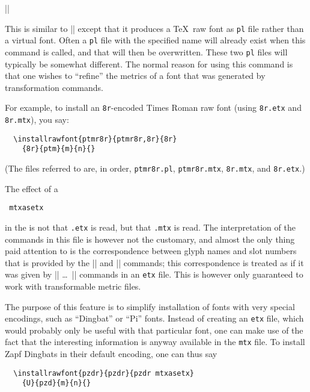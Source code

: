 \documentclass[a4paper]{ltxguide}
\makeatletter
\newenvironment{decl*}[1][]{%
   \par
   \small
   \addvspace{2.3ex}%
   \vskip -\parskip
   \ifx\relax#1\relax
      \def\@decl@date{}%
   \else
      \def\@decl@date{\NEWfeature{#1}}%
   \fi
   \noindent\hspace{-\leftmargini}%
   \begin{tabular}{|l|}%
      \hline\ignorespaces
}{%
      \\\hline
   \end{tabular}%
   \nobreak\@decl@date\par\nobreak
   \vspace{2.3ex}\vskip -\parskip
}
\newcommand*{\meta}{\m}
\newcommand*{\setfilename}[1]{\texttt{#1}}
\newcommand{\pl} {\setfilename{pl}\xspace}
\newcommand{\mtx}{\setfilename{mtx}\xspace}
\newcommand{\etx}{\setfilename{etx}\xspace}
\makeatother
\begin{document}
\begin{decl}
  |\installrawfont|\\
  \hspace*{1.5em}%
\end{decl}
This is similar to |\installfont| except that it produces
a \TeX\ raw font as \pl file rather than a virtual font. Often a \pl 
file with the specified name will already exist when this command is 
called, and that will then be overwritten. These two \pl files will 
typically be somewhat different.
The normal reason for using this command is that one wishes to 
``refine'' the metrics of a font that was generated by transformation 
commands.

For example, to install an \texttt{8r}-encoded Times Roman raw font
(using \texttt{8r.etx} and \texttt{8r.mtx}), you say:
\begin{verbatim}
  \installrawfont{ptmr8r}{ptmr8r,8r}{8r}
    {8r}{ptm}{m}{n}{}
\end{verbatim}
(The files referred to are, in order, \texttt{ptmr8r.pl}, 
\texttt{ptmr8r.mtx}, \texttt{8r.mtx}, and \texttt{8r.etx}.)

The effect of a
\begin{decl*}[v1.923]
  \meta{filename}\verb*| mtxasetx|
\end{decl*}
in the \meta{etx-list} is not that \meta{filename}\texttt{.etx} is 
read, but that \meta{filename}\texttt{.mtx} is read. The 
interpretation of the commands in this file is however not the 
customary, and almost the only thing paid attention to is the 
correspondence between glyph names and slot numbers that is provided 
by the |\setrawglyph| and |\setscaledrawglyph| commands; this 
correspondence is treated as if it was given by |\setslot| \dots\ 
|\endsetslot| commands in an \etx file. This is however only 
guaranteed to work with transformable metric files.

The purpose of this feature is to simplify installation of fonts with 
very special encodings, such as ``Dingbat'' or ``Pi'' fonts. Instead 
of creating an \etx file, which would probably only be useful with 
that particular font, one can make use of the fact that the 
interesting information is anyway available in the \mtx file. To 
install Zapf Dingbats in their default encoding, one can thus say
\begin{verbatim}
  \installrawfont{pzdr}{pzdr}{pzdr mtxasetx}
    {U}{pzd}{m}{n}{}
\end{verbatim}
\end{document}
